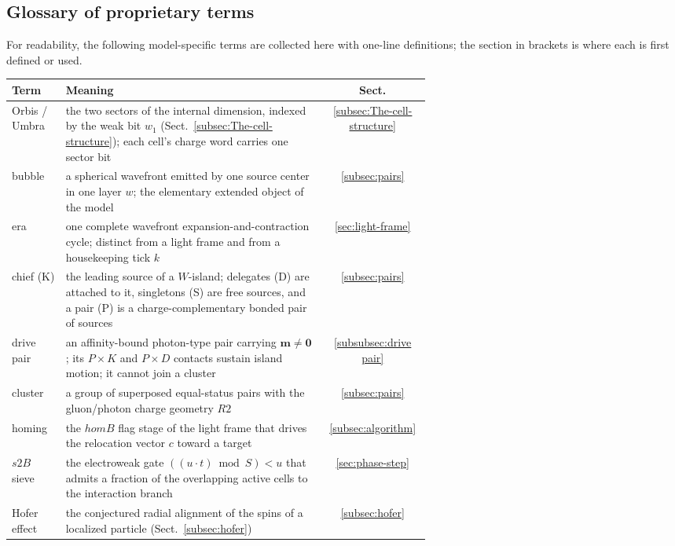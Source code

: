 \documentclass{ijuc}
\begin{document}
\subsection*{Glossary of proprietary terms}
For readability, the following model-specific terms are collected here with one-line definitions; the section in brackets is where each is first defined or used.
\begin{center}
\begin{tabular}{|l|p{0.62\linewidth}|c|}
\hline
\textbf{Term} & \textbf{Meaning} & \textbf{Sect.}\\
\hline
Orbis / Umbra & the two sectors of the internal dimension, indexed by the weak bit $w_1$ (Sect.~\ref{subsec:The-cell-structure}); each cell's charge word carries one sector bit & \ref{subsec:The-cell-structure}\\
\hline
bubble & a spherical wavefront emitted by one source center in one layer $w$; the elementary extended object of the model & \ref{subsec:pairs}\\
\hline
era & one complete wavefront expansion-and-contraction cycle; distinct from a light frame and from a housekeeping tick $k$ & \ref{sec:light-frame}\\
\hline
chief (K) & the leading source of a $W$-island; delegates (D) are attached to it, singletons (S) are free sources, and a pair (P) is a charge-complementary bonded pair of sources & \ref{subsec:pairs}\\
\hline
drive pair & an affinity-bound photon-type pair carrying $\boldsymbol{m}\ne\mathbf{0}$; its $P\times K$ and $P\times D$ contacts sustain island motion; it cannot join a cluster & \ref{subsubsec:drive pair}\\
\hline
cluster & a group of superposed equal-status pairs with the gluon/photon charge geometry $R2$ & \ref{subsec:pairs}\\
\hline
homing & the $homB$ flag stage of the light frame that drives the relocation vector $c$ toward a target & \ref{subsec:algorithm}\\
\hline
$s2B$ sieve & the electroweak gate $((u\cdot t)\bmod S)<u$ that admits a fraction of the overlapping active cells to the interaction branch & \ref{sec:phase-step}\\
\hline
Hofer effect & the conjectured radial alignment of the spins of a localized particle (Sect.~\ref{subsec:hofer}) & \ref{subsec:hofer}\\
\hline
\end{tabular}
\end{center}
\end{document}
